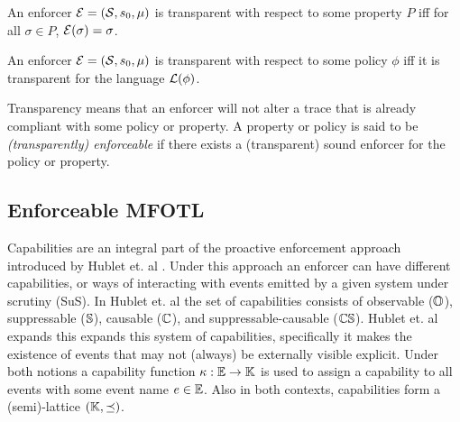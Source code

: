 \begin{definition}
    \label{def:enf-transparent-property}
    An enforcer $\mathcal{E} = \left( \mathcal{S}, s_0, \mu \right)$ is transparent
    with respect to some property $P$ iff for all $\sigma \in P$,
    $\mathcal{E}(\sigma) = \sigma$.
\end{definition}
\begin{definition}
    \label{def:enf-transparent-policy}
    An enforcer $\mathcal{E} = \left( \mathcal{S}, s_0, \mu \right)$ is transparent
    with respect to some policy $\phi$ iff it is transparent for
    the language $\mathcal{L}(\phi)$.
\end{definition}
Transparency means that an enforcer will not alter a trace that is already
compliant with some policy or property.
A property or policy is said to be \emph{(transparently) enforceable} if there
exists a (transparent) sound enforcer for the policy or property.


\subsection{Enforceable MFOTL}
\label{subsection:emfotl}
Capabilities are an integral part of the proactive enforcement
approach introduced by Hublet et. al \cite{whyenf}.
Under this approach an enforcer can have different capabilities, or ways of interacting
with events emitted by a given system under scrutiny (SuS).
In Hublet et. al the set of capabilities consists of observable ($\mathbb{O}$),
suppressable ($\mathbb{S}$), causable ($\mathbb{C}$),
and suppressable-causable ($\mathbb{C} \mathbb{S}$).
Hublet et. al \cite{lex} expands this expands this system of capabilities, specifically it
makes the existence of events that may not (always) be externally visible explicit.
Under both notions a capability function $\kappa : \mathbb{E} \to \mathbb{K}$ is used
to assign a capability to all events with some event name $e \in \mathbb{E}$.
Also in both contexts, capabilities form a (semi)-lattice $(\mathbb{K}, \preceq)$.


